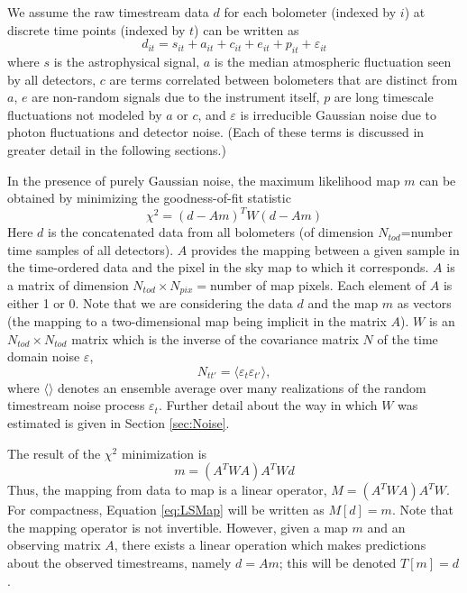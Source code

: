 \documentclass[12pt,preprint]{aastex}
\newcommand{\epsi}{\varepsilon}
\begin{document}
We assume the raw timestream data $d$ for each bolometer (indexed by
$i$) at discrete time points (indexed by $t$) can be written as
\begin{equation}
\label{eq:TimeDomainModel}
d_{it} = s_{it}+a_{it}+c_{it}+e_{it}+p_{it}+\epsi_{it}
\end{equation}
where $s$ is the astrophysical signal, $a$ is the median atmospheric
fluctuation seen by all detectors, $c$ are terms correlated between
bolometers that are distinct from $a$, $e$ are non-random signals due
to the instrument itself, $p$ are long timescale fluctuations not
modeled by $a$ or $c$, and $\epsi$ is irreducible Gaussian noise due
to photon fluctuations and detector noise.  (Each of these terms is
discussed in greater detail in the following sections.)

In the presence of purely Gaussian noise, the maximum likelihood map
$m$ can be obtained by minimizing the goodness-of-fit statistic
\begin{equation}
\label{eq:ChiSquared}
\chi^2 = (d - Am)^T W (d - Am)
\end{equation}
Here $d$ is the concatenated data from all bolometers (of dimension
$N_{tod}$=number time samples of all detectors).  $A$ provides the
mapping between a given sample in the time-ordered data and the pixel
in the sky map to which it corresponds.  $A$ is a matrix of dimension
$N_{tod} \times N_{pix} =$number of map pixels.  Each element of $A$
is either 1 or 0.  Note that we are considering the data $d$ and the
map $m$ as vectors (the mapping to a two-dimensional map being
implicit in the matrix $A$).  $W$ is an $N_{tod} \times N_{tod}$
matrix which is the inverse of the covariance matrix $N$ of the time
domain noise $\epsi$,
\begin{equation}
\label{eq:NoiseCovariance}
N_{tt'} = \langle \epsi_t \epsi_{t'} \rangle,
\end{equation}
where $\langle \rangle$ denotes an ensemble average over many
realizations of the random time\-stream noise process $\epsi_t$.
Further detail about the way in which $W$ was estimated is given in
Section \ref{sec:Noise}.

The result of the $\chi^2$ minimization is
\begin{equation}
\label{eq:LSMap}
m = (A^T W A) A^T W d
\end{equation}
Thus, the mapping from data to map is a linear operator, $M =(A^T W A)
A^T W$.  For compactness, Equation \ref{eq:LSMap} will be written as
$M[d] = m$.  Note that the mapping operator is not invertible.
However, given a map $m$ and an observing matrix $A$, there exists a
linear operation which makes predictions about the observed
timestreams, namely $d = A m$; this will be denoted $T[m] = d$. 
\end{document}
